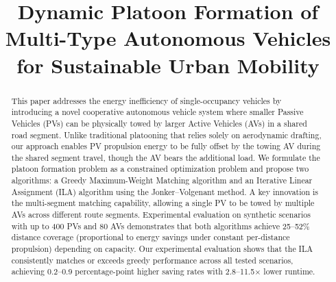 \documentclass[conference]{IEEEtran}
\begin{document}
\title{Dynamic Platoon Formation of Multi-Type Autonomous Vehicles for Sustainable Urban Mobility}


\maketitle

\begin{abstract}
This paper addresses the energy inefficiency of single-occupancy vehicles by introducing a novel cooperative autonomous vehicle system where smaller Passive Vehicles (PVs) can be physically towed by larger Active Vehicles (AVs) in a shared road segment. Unlike traditional platooning that relies solely on aerodynamic drafting, our approach enables PV propulsion energy to be fully offset by the towing AV during the shared segment travel, though the AV bears the additional load. We formulate the platoon formation problem as a constrained optimization problem and propose two algorithms: a Greedy Maximum-Weight Matching algorithm and an Iterative Linear Assignment (ILA) algorithm using the Jonker--Volgenant method. A key innovation is the multi-segment matching capability, allowing a single PV to be towed by multiple AVs across different route segments. Experimental evaluation on synthetic scenarios with up to 400 PVs and 80 AVs demonstrates that both algorithms achieve 25--52\% distance coverage (proportional to energy savings under constant per-distance propulsion) depending on capacity.
Our experimental evaluation shows that the ILA consistently matches or exceeds greedy performance across all tested scenarios, achieving 0.2--0.9 percentage-point higher saving rates with 2.8--11.5$\times$ lower runtime.
\end{abstract}
\end{document}
